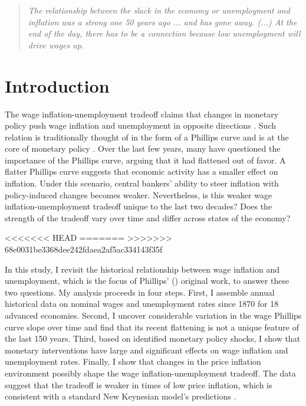 \documentclass[12pt]{article}
\begin{document}
\clearpage

\begin{quote}
\textit{The relationship between the slack in the economy or unemployment and inflation was a strong one 50 years ago ... and has gone away. (...) At the end of the day, there has to be a connection because low unemployment will drive wages up.} \cite{Powell2019}
\end{quote}


\section{Introduction}
The wage inflation-unemployment tradeoff claims that changes in monetary policy push wage inflation and unemployment in opposite directions \citep{Mankiw2001}. Such relation is traditionally thought of in the form of a Phillips curve and is at the core of monetary policy \citep{Barnichon2019, Eser2020}. Over the last few years, many have questioned the importance of the Phillips curve, arguing that it had flattened out of favor. A flatter Phillips curve suggests that economic activity has a smaller effect on inflation. Under this scenario, central bankers' ability to steer inflation with policy-induced changes becomes weaker. Nevertheless, is this weaker wage inflation-unemployment tradeoff unique to the last two decades? Does the strength of the tradeoff vary over time and differ across states of the economy?

<<<<<<< HEAD
=======
>>>>>>> 68e0031be3368dee242fdaea2af5ac334143f35f

In this study, I revisit the historical relationship between wage inflation and unemployment, which is the focus of Phillips' (\citeyear{Phillips1958}) original work, to answer these two questions. My analysis proceeds in four steps. First, I assemble annual historical data on nominal wages and unemployment rates since 1870 for 18 advanced economies. Second, I uncover considerable variation in the wage Phillips curve slope over time and find that its recent flattening is not a unique feature of the last 150 years. Third, based on identified monetary policy shocks, I show that monetary interventions have large and significant effects on wage inflation and unemployment rates. Finally, I show that changes in the price inflation environment possibly shape the wage inflation-unemployment tradeoff. The data suggest that the tradeoff is weaker in times of low price inflation, which is consistent with a standard New Keynesian model's predictions \citep{Benati2007}.
\end{document}

